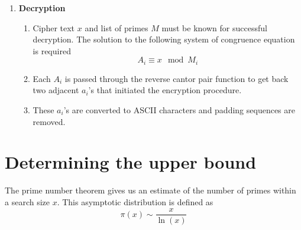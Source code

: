 \begin{enumerate}
    \item \textbf{Decryption}
    \begin{enumerate}
        \item Cipher text $x$ and list of primes $M$ must be known for successful decryption. The solution to the following system of congruence equation is required $$A_i\equiv x\mod M_i$$
        \item Each $A_i$ is passed through the reverse cantor pair function to get back two adjacent $a_i$'s that initiated the encryption procedure.
        \item These $a_i$'s are converted to ASCII characters and padding sequences are removed.
    \end{enumerate}
\end{enumerate}

\section{Determining the upper bound}
\label{sec:7}
The prime number theorem gives us an estimate of the number of primes within a search size $x$. This asymptotic distribution is defined as $$\pi(x)\sim\dfrac{x}{\ln(x)}$$
